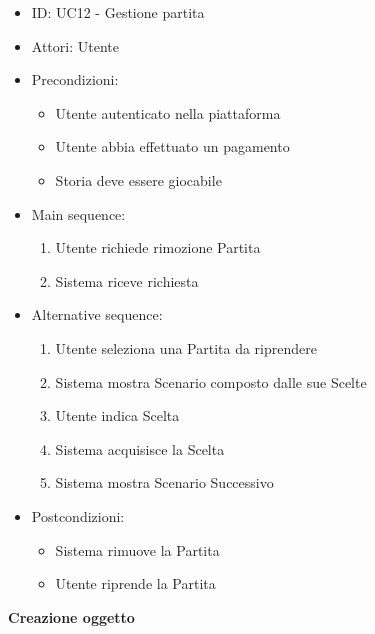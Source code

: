 \documentclass{article}
\begin{document}
\begin{itemize}[label = { }]
    \itemsep0px
    \item ID: UC12 - Gestione partita
    \item Attori: Utente
    \item Precondizioni: 
        \begin{itemize}[label = {-}]
            \item Utente autenticato nella piattaforma
            \item Utente abbia effettuato un pagamento
            \item Storia deve essere giocabile
        \end{itemize}
    \item Main sequence: 
        \begin{enumerate}
            \item Utente richiede rimozione Partita
            \item Sistema riceve richiesta
        \end{enumerate}
    \item Alternative sequence:
        \begin{enumerate}
            \item Utente seleziona una Partita da riprendere
            \item Sistema mostra Scenario composto dalle sue Scelte
            \item Utente indica Scelta
            \item Sistema acquisisce la Scelta
            \item Sistema mostra Scenario Successivo
        \end{enumerate}
    \item Postcondizioni: 
        \begin{itemize}[label = {-}]
            \item Sistema rimuove la Partita
            \item Utente riprende la Partita
        \end{itemize}
\end{itemize}
\textbf{Creazione oggetto}
\end{document}
